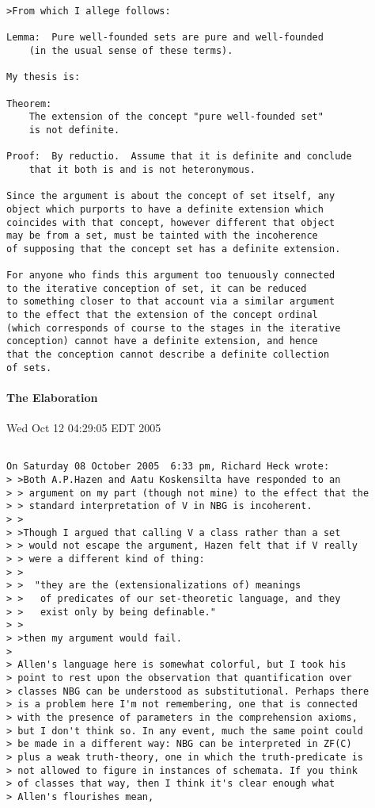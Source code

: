 \documentclass[numreferences]{rbjk}
\begin{document}
\begin{article}
\begin{verbatim}
>From which I allege follows:

Lemma:	Pure well-founded sets are pure and well-founded
	(in the usual sense of these terms).

My thesis is:

Theorem:
	The extension of the concept "pure well-founded set"
	is not definite.

Proof:  By reductio.  Assume that it is definite and conclude
	that it both is and is not heteronymous.

Since the argument is about the concept of set itself, any
object which purports to have a definite extension which
coincides with that concept, however different that object
may be from a set, must be tainted with the incoherence
of supposing that the concept set has a definite extension.

For anyone who finds this argument too tenuously connected
to the iterative conception of set, it can be reduced
to something closer to that account via a similar argument
to the effect that the extension of the concept ordinal
(which corresponds of course to the stages in the iterative
conception) cannot have a definite extension, and hence
that the conception cannot describe a definite collection
of sets. 

\end{verbatim}

\paragraph{The Elaboration}

Wed Oct 12 04:29:05 EDT 2005

\begin{verbatim}

On Saturday 08 October 2005  6:33 pm, Richard Heck wrote:
> >Both A.P.Hazen and Aatu Koskensilta have responded to an
> > argument on my part (though not mine) to the effect that the
> > standard interpretation of V in NBG is incoherent.
> >
> >Though I argued that calling V a class rather than a set
> > would not escape the argument, Hazen felt that if V really
> > were a different kind of thing:
> >
> >  "they are the (extensionalizations of) meanings
> >   of predicates of our set-theoretic language, and they
> >   exist only by being definable."
> >
> >then my argument would fail.
>
> Allen's language here is somewhat colorful, but I took his
> point to rest upon the observation that quantification over
> classes NBG can be understood as substitutional. Perhaps there
> is a problem here I'm not remembering, one that is connected
> with the presence of parameters in the comprehension axioms,
> but I don't think so. In any event, much the same point could
> be made in a different way: NBG can be interpreted in ZF(C)
> plus a weak truth-theory, one in which the truth-predicate is
> not allowed to figure in instances of schemata. If you think
> of classes that way, then I think it's clear enough what
> Allen's flourishes mean,


\end{verbatim}
\end{article}
\end{document}

